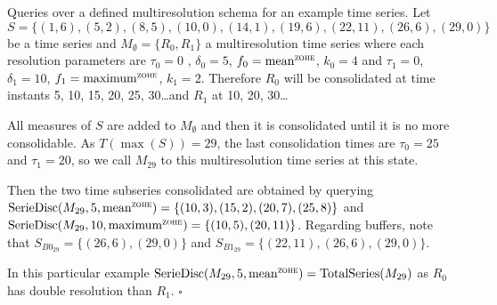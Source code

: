 \begin{example} Queries over a defined multiresolution schema for an
  example time series.  Let $S = \{ (1,6),(5,2),\allowbreak
  (8,5),\allowbreak (10,0),\allowbreak (14,1),\allowbreak (19,6),\allowbreak
  (22,11),\allowbreak (26,6),(29,0) \}$ be a time series and
  $M_\emptyset=\{R_0,R_1\}$ a multiresolution time series where each
  resolution parameters are $\tau_0=0$ , $\delta_0=5$, $f_0 =\meanz$,
  $k_0=4$ and $\tau_1=0$, $\delta_1=10$, $f_1 =\maxz$,
  $k_1=2$. Therefore $R_0$ will be consolidated at time instants 5,
  10, 15, 20, 25, 30\dots and $R_1$ at 10, 20, 30\dots

  All measures of $S$ are added to $M_\emptyset$
  and then it is consolidated until it is no more consolidable. As
  $T(\max(S))=29$, the last consolidation times are $\tau_0=25$ and
  $\tau_1=20$, so we call $M_{29}$ to this multiresolution time series
  at this state.

  Then the two time subseries consolidated are obtained by querying
  $\seriedisc(M_{29},5,\meanz)=\{(10,3),(15,2),\break
  (20,7),\allowbreak (25,8)\}$ and $\seriedisc(M_{29},10,\maxz)= \{
  \allowbreak (10,5),\allowbreak (20,11)\}$. Regarding buffers, note
  that $S_{B0_{29}}= \{\allowbreak (26,6),\allowbreak (29,0)\}$ and
  $S_{B1_{29}}=\{(22,11),(26,6),(29,0)\}$.

  In this particular example $\seriedisc(M_{29},5,\meanz)=\break
  \totalseries(M_{29})$ as $R_0$ has double resolution than
  $R_1$. $\square$
\end{example}







